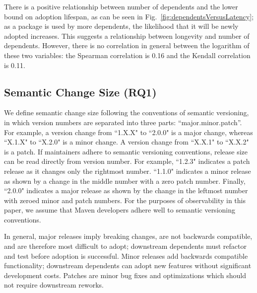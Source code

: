 \documentclass[conference]{IEEEtran}
\begin{document}
There is a positive relationship between number of dependents and the lower bound on adoption lifespan, as can be seen in Fig.~\ref{fig:dependentsVersusLatency}; as a package is used by more dependents, the likelihood that it will be newly adopted increases. This suggests a relationship between longevity and number of dependents. However, there is no correlation in general between the logarithm of these two variables: the Spearman correlation is 0.16 and the Kendall correlation is 0.11.


\subsection{Semantic Change Size (RQ1)} \label{sec: size}
We define semantic change size following the conventions of semantic versioning, in which version numbers are separated into three parts: ``major.minor.patch''. For example, a version change from ``1.X.X" to ``2.0.0" is a major change, whereas ``X.1.X" to ``X.2.0" is a minor change. A version change from ``X.X.1" to ``X.X.2" is a patch. If maintainers adhere to semantic versioning conventions, release size can be read directly from version number. For example, ``1.2.3" indicates a patch release as it changes only the rightmost number. ``1.1.0" indicates a minor release as shown by a change in the middle number with a zero patch number. Finally, ``2.0.0" indicates a major release as shown by the change in the leftmost number with zeroed minor and patch numbers. For the purposes of observability in this paper, we assume that Maven developers adhere well to semantic versioning conventions. 

In general, major releases imply breaking changes, are not backwards compatible, and are therefore most difficult to adopt; downstream dependents must refactor and test before adoption is successful. Minor releases add backwards compatible functionality; downstream dependents can adopt new features without significant development costs. Patches are minor bug fixes and optimizations which should not require downstream reworks.
\end{document}
